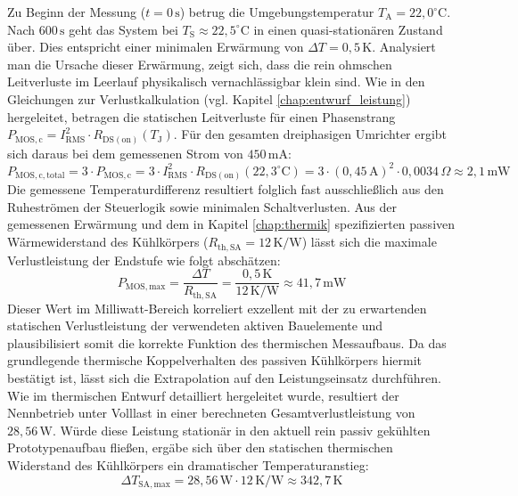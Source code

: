Zu Beginn der Messung ($t=0\,\mathrm{s}$) betrug die Umgebungstemperatur $T_{\mathrm{A}} = 22{,}0^\circ\mathrm{C}$. Nach $600\,\mathrm{s}$ geht das System bei $T_{\mathrm{S}} \approx 22{,}5^\circ\mathrm{C}$ in einen quasi-stationären Zustand über. Dies entspricht einer minimalen Erwärmung von $\Delta T = 0{,}5\,\mathrm{K}$. 
Analysiert man die Ursache dieser Erwärmung, zeigt sich, dass die rein ohmschen Leitverluste im Leerlauf physikalisch vernachlässigbar klein sind.
Wie in den Gleichungen zur Verlustkalkulation (vgl. Kapitel \ref{chap:entwurf_leistung}) hergeleitet, betragen die statischen Leitverluste für einen Phasenstrang $P_{\mathrm{MOS,c}} = I_{\mathrm{RMS}}^2 \cdot R_{\mathrm{DS(on)}}(T_\mathrm{J})$. Für den gesamten dreiphasigen Umrichter ergibt sich daraus bei dem gemessenen Strom von $450\,\mathrm{mA}$:
\begin{equation}
    P_{\mathrm{MOS,c,total}} = 3 \cdot P_{\mathrm{MOS,c}} = 3 \cdot I_{\mathrm{RMS}}^2 \cdot R_{\mathrm{DS(on)}}(22{,}3^\circ\mathrm{C}) = 3 \cdot (0{,}45\,\mathrm{A})^2 \cdot 0{,}0034\,\Omega \approx 2{,}1\,\mathrm{mW}
\end{equation}
Die gemessene Temperaturdifferenz resultiert folglich fast ausschließlich aus den Ruheströmen der Steuerlogik sowie minimalen Schaltverlusten. Aus der gemessenen Erwärmung und dem in Kapitel \ref{chap:thermik} spezifizierten passiven Wärmewiderstand des Kühlkörpers ($R_{\mathrm{th,SA}} = 12\,\mathrm{K/W}$) lässt sich die maximale Verlustleistung der Endstufe wie folgt abschätzen:
\begin{equation}
    P_{\mathrm{MOS,max}} = \frac{\Delta T}{R_{\mathrm{th,SA}}} = \frac{0{,}5\,\mathrm{K}}{12\,\mathrm{K/W}} \approx 41{,}7\,\mathrm{mW}
\end{equation}
Dieser Wert im Milliwatt-Bereich korreliert exzellent mit der zu erwartenden statischen Verlustleistung der verwendeten aktiven Bauelemente und plausibilisiert somit die korrekte Funktion des thermischen Messaufbaus.
Da das grundlegende thermische Koppelverhalten des passiven Kühlkörpers hiermit bestätigt ist, lässt sich die Extrapolation auf den Leistungseinsatz durchführen. Wie im thermischen Entwurf detailliert hergeleitet wurde, resultiert der Nennbetrieb unter Volllast in einer berechneten Gesamtverlustleistung von $28{,}56\,\mathrm{W}$. 
Würde diese Leistung stationär in den aktuell rein passiv gekühlten Prototypenaufbau fließen, ergäbe sich über den statischen thermischen Widerstand des Kühlkörpers ein dramatischer Temperaturanstieg:
\begin{equation}
    \Delta T_{\mathrm{SA,max}} = 28{,}56\,\mathrm{W} \cdot 12\,\mathrm{K/W} \approx 342{,}7\,\mathrm{K}
\end{equation}
